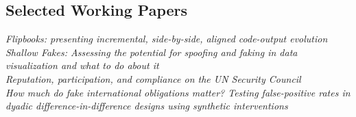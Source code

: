 \documentclass[margin, 10pt]{CVStyleTemplate}\usepackage[]{graphicx}\usepackage[]{color}
\begin{document}
\begin{resume}
\section{Selected Working Papers}


\emph{Flipbooks: presenting incremental, side-by-side, aligned code-output evolution}\\[6pt]
\emph{Shallow Fakes: Assessing the potential for spoofing and faking in data visualization and what to do about it}\\[6pt]
\emph{Reputation, participation, and compliance on the UN Security Council}\\[6pt]
\emph{How much do \emph{fake} international obligations matter?  Testing false-positive rates in dyadic difference-in-difference designs using synthetic interventions}\\[6pt]

%
%
%
%
%



\end{resume}
\end{document}

